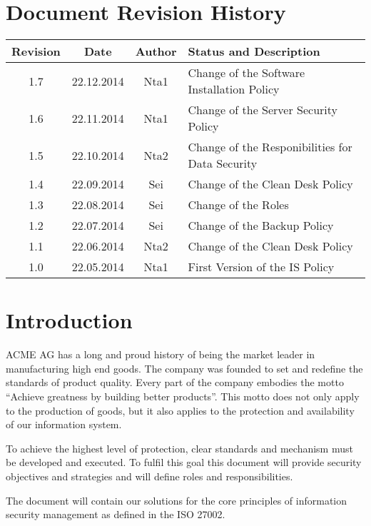 \chapter{Document Revision History}

\begin{tabular}{cccl}
\toprule
Revision & Date & Author & Status and Description \\ 
\midrule
1.7 & 22.12.2014 & Nta1 &  Change of the Software Installation Policy\\ 
1.6 & 22.11.2014 & Nta1 & Change of the Server Security Policy \\
1.5 & 22.10.2014 & Nta2 & Change of the Responibilities for Data Security \\ 
1.4 & 22.09.2014 & Sei & Change of the Clean Desk Policy \\ 
1.3 & 22.08.2014 & Sei & Change of the Roles \\ 
1.2 & 22.07.2014 & Sei & Change of the Backup Policy \\ 
1.1 & 22.06.2014 & Nta2 & Change of the Clean Desk Policy \\ 
1.0 & 22.05.2014 & Nta1 & First Version of the IS Policy \\ 
\bottomrule
\end{tabular} 


\chapter{Introduction}
ACME AG has a long and proud history of being the market leader in
manufacturing high end goods. The company was founded to set and redefine the
standards of product quality. Every part of the company embodies the motto
“Achieve greatness by building better products”. This motto does not only apply
to the production of goods, but it also applies to the protection and
availability of our information system. 

To achieve the highest level of protection, clear standards and mechanism must
be developed and executed. To fulfil this goal this document will provide
security objectives and strategies and will define roles and responsibilities.

The document will contain our solutions for the core principles of information
security management as defined in the ISO 27002.

